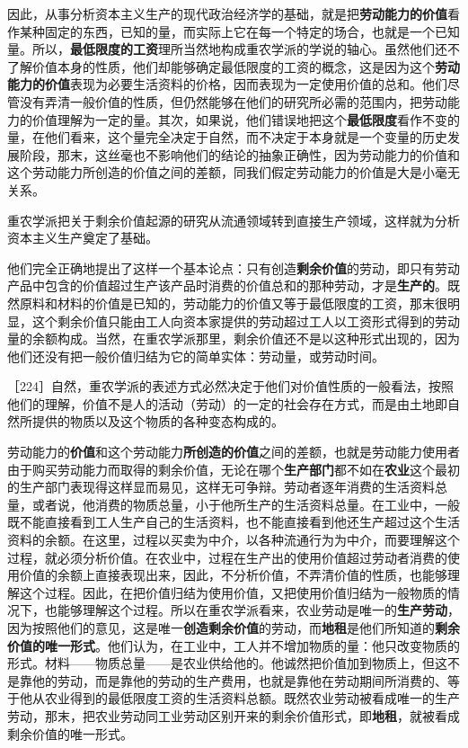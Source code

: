 因此，从事分析资本主义生产的现代政治经济学的基础，就是把\textbf{劳动能力的价值}看作某种固定的东西，已知的量，而实际上它在每一个特定的场合，也就是一个已知量。所以，\textbf{最低限度的工资}理所当然地构成重农学派的学说的轴心。虽然他们还不了解价值本身的性质，他们却能够确定最低限度的工资的概念，这是因为这个\textbf{劳动能力的价值}表现为必要生活资料的价格，因而表现为一定使用价值的总和。他们尽管没有弄清一般价值的性质，但仍然能够在他们的研究所必需的范围内，把劳动能力的价值理解为一定的量。其次，如果说，他们错误地把这个\textbf{最低限度}看作不变的量，在他们看来，这个量完全决定于自然，而不决定于本身就是一个变量的历史发展阶段，那末，这丝毫也不影响他们的结论的抽象正确性，因为劳动能力的价值和这个劳动能力所创造的价值之间的差额，同我们假定劳动能力的价值是大是小毫无关系。

重农学派把关于剩余价值起源的研究从流通领域转到直接生产领域，这样就为分析资本主义生产奠定了基础。

他们完全正确地提出了这样一个基本论点：只有创造\textbf{剩余价值}的劳动，即只有劳动产品中包含的价值超过生产该产品时消费的价值总和的那种劳动，才是\textbf{生产的}。既然原料和材料的价值是已知的，劳动能力的价值又等于最低限度的工资，那末很明显，这个剩余价值只能由工人向资本家提供的劳动超过工人以工资形式得到的劳动量的余额构成。当然，在重农学派那里，剩余价值还不是以这种形式出现的，因为他们还没有把一般价值归结为它的简单实体：劳动量，或劳动时间。

［224］自然，重农学派的表述方式必然决定于他们对价值性质的一般看法，按照他们的理解，价值不是人的活动（劳动）的一定的社会存在方式，而是由土地即自然所提供的物质以及这个物质的各种变态构成的。

劳动能力的\textbf{价值}和这个劳动能力\textbf{所创造的价值}之间的差额，也就是劳动能力使用者由于购买劳动能力而取得的剩余价值，无论在哪个\textbf{生产部门}都不如在\textbf{农业}这个最初的生产部门表现得这样显而易见，这样无可争辩。劳动者逐年消费的生活资料总量，或者说，他消费的物质总量，小于他所生产的生活资料总量。在工业中，一般既不能直接看到工人生产自己的生活资料，也不能直接看到他还生产超过这个生活资料的余额。在这里，过程以买卖为中介，以各种流通行为为中介，而要理解这个过程，就必须分析价值。在农业中，过程在生产出的使用价值超过劳动者消费的使用价值的余额上直接表现出来，因此，不分析价值，不弄清价值的性质，也能够理解这个过程。因此，在把价值归结为使用价值，又把使用价值归结为一般物质的情况下，也能够理解这个过程。所以在重农学派看来，农业劳动是唯一的\textbf{生产劳动}，因为按照他们的意见，这是唯一\textbf{创造剩余价值}的劳动，而\textbf{地租}是他们所知道的\textbf{剩余价值的唯一形式}。他们认为，在工业中，工人并不增加物质的量：他只改变物质的形式。材料——物质总量——是农业供给他的。他诚然把价值加到物质上，但这不是靠他的劳动，而是靠他的劳动的生产费用，也就是靠他在劳动期间所消费的、等于他从农业得到的最低限度工资的生活资料总额。既然农业劳动被看成唯一的生产劳动，那末，把农业劳动同工业劳动区别开来的剩余价值形式，即\textbf{地租}，就被看成剩余价值的唯一形式。

